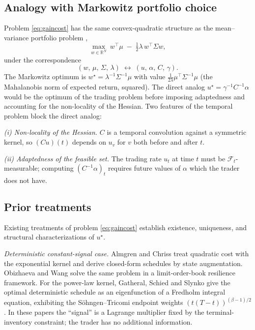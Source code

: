 \documentclass[11pt]{article}
\newcommand{\R}{\mathbb{R}}
\newcommand{\F}{\mathcal{F}}
\theoremstyle{plain}
\begin{document}
\subsection{Analogy with Markowitz portfolio choice}

Problem \eqref{eq:gaincost} has the same convex-quadratic structure as the mean--variance portfolio problem \citep{Markowitz1952,Merton1972},
\begin{equation}\label{eq:markowitz}
\max_{w\in\R^N}\ w^\top\mu \;-\; \tfrac{1}{2}\lambda\, w^\top\Sigma w,
\end{equation}
under the correspondence
\[
(w,\,\mu,\,\Sigma,\,\lambda) \;\longleftrightarrow\; (u,\,\alpha,\,C,\,\gamma).
\]
The Markowitz optimum is $w^\star = \lambda^{-1}\Sigma^{-1}\mu$ with value $\tfrac{1}{2\lambda}\mu^\top\Sigma^{-1}\mu$ (the Mahalanobis norm of expected return, squared). The direct analog $u^\star = \gamma^{-1}C^{-1}\alpha$ would be the optimum of the trading problem before imposing adaptedness and accounting for the non-locality of the Hessian. Two features of the temporal problem block the direct analog:

\emph{(i) Non-locality of the Hessian.} $C$ is a temporal convolution against a symmetric kernel, so $(Cu)(t)$ depends on $u_v$ for $v$ both before and after $t$.

\emph{(ii) Adaptedness of the feasible set.} The trading rate $u_t$ at time $t$ must be $\F_t$-measurable; computing $(C^{-1}\alpha)_t$ requires future values of $\alpha$ which the trader does not have.

\subsection{Prior treatments}

Existing treatments of problem \eqref{eq:gaincost} establish existence, uniqueness, and structural characterizations of $u^\star$.

\emph{Deterministic constant-signal case.} Almgren and Chriss \citeyearpar{AlmgrenChriss2001} treat quadratic cost with the exponential kernel and derive closed-form schedules by state augmentation. Obizhaeva and Wang \citeyearpar{ObizhaevaWang2013} solve the same problem in a limit-order-book resilience framework. For the power-law kernel, Gatheral, Schied and Slynko \citeyearpar{GatheralSchiedSlynko2012} give the optimal deterministic schedule as an eigenfunction of a Fredholm integral equation, exhibiting the S\"ohngen--Tricomi endpoint weights $(t(T-t))^{(\beta-1)/2}$. In these papers the ``signal'' is a Lagrange multiplier fixed by the terminal-inventory constraint; the trader has no additional information.
\end{document}
